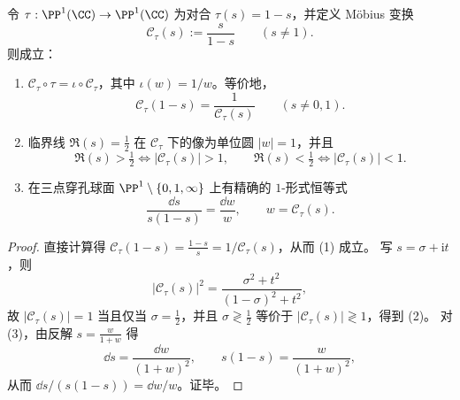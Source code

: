 

\begin{proposition}\label{prop:xi-cayley-tau-conjugacy-logdiff}
令 \(\tau:\PP^1(\CC)\to\PP^1(\CC)\) 为对合 \(\tau(s)=1-s\)，并定义 Möbius 变换
\[
\mathcal C_\tau(s):=\frac{s}{1-s}\qquad (s\neq 1).
\]
则成立：
\begin{enumerate}
  \item \(\mathcal C_\tau\circ\tau=\iota\circ\mathcal C_\tau\)，其中 \(\iota(w)=1/w\)。等价地，
  \[
  \mathcal C_\tau(1-s)=\frac{1}{\mathcal C_\tau(s)}\qquad (s\neq 0,1).
  \]
  \item 临界线 \(\Re(s)=\tfrac12\) 在 \(\mathcal C_\tau\) 下的像为单位圆 \(|w|=1\)，并且
  \[
  \Re(s)>\tfrac12\iff |\mathcal C_\tau(s)|>1,\qquad
  \Re(s)<\tfrac12\iff |\mathcal C_\tau(s)|<1.
  \]
  \item 在三点穿孔球面 \(\PP^1\setminus\{0,1,\infty\}\) 上有精确的 \(1\)-形式恒等式
  \[
  \frac{\dd s}{s(1-s)}=\frac{\dd w}{w},\qquad w=\mathcal C_\tau(s).
  \]
\end{enumerate}
\end{proposition}
\begin{proof}
直接计算得
\(
\mathcal C_\tau(1-s)=\frac{1-s}{s}=1/\mathcal C_\tau(s)
\)，从而 (1) 成立。
写 \(s=\sigma+\mathrm{i}t\)，则
\[
|\mathcal C_\tau(s)|^2=\frac{\sigma^2+t^2}{(1-\sigma)^2+t^2},
\]
故 \(|\mathcal C_\tau(s)|=1\) 当且仅当 \(\sigma=\tfrac12\)，并且 \(\sigma\gtrless \tfrac12\) 等价于 \(|\mathcal C_\tau(s)|\gtrless 1\)，得到 (2)。
对 (3)，由反解 \(s=\frac{w}{1+w}\) 得
\[
\dd s=\frac{\dd w}{(1+w)^2},\qquad s(1-s)=\frac{w}{(1+w)^2},
\]
从而 \(\dd s/(s(1-s))=\dd w/w\)。证毕。
\end{proof}

